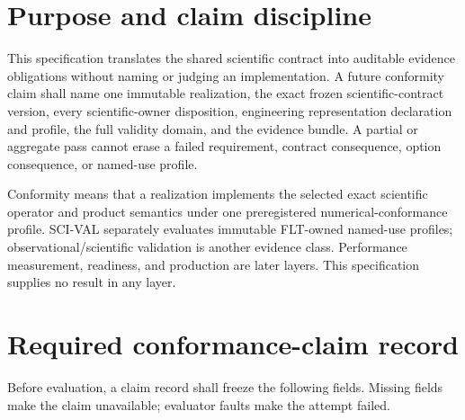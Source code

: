 \documentclass[10pt]{article}
\begin{document}
\section{Purpose and claim discipline}

This specification translates the shared scientific contract into auditable
evidence obligations without naming or judging an implementation. A future
conformity claim shall name one immutable realization, the exact frozen
scientific-contract version, every scientific-owner disposition, engineering
representation declaration and profile,
the full validity domain, and the evidence bundle. A partial or aggregate pass
cannot erase a failed requirement, contract consequence, option consequence, or named-use
profile.

Conformity means that a realization implements the selected exact scientific
operator and product semantics under one preregistered numerical-conformance
profile. SCI-VAL separately evaluates immutable FLT-owned named-use profiles;
observational/scientific validation is another evidence class. Performance measurement,
readiness, and production are later layers. This specification supplies no result in
any layer.

\section{Required conformance-claim record}

Before evaluation, a claim record shall freeze the following fields. Missing
fields make the claim unavailable; evaluator faults make the attempt failed.
\end{document}
